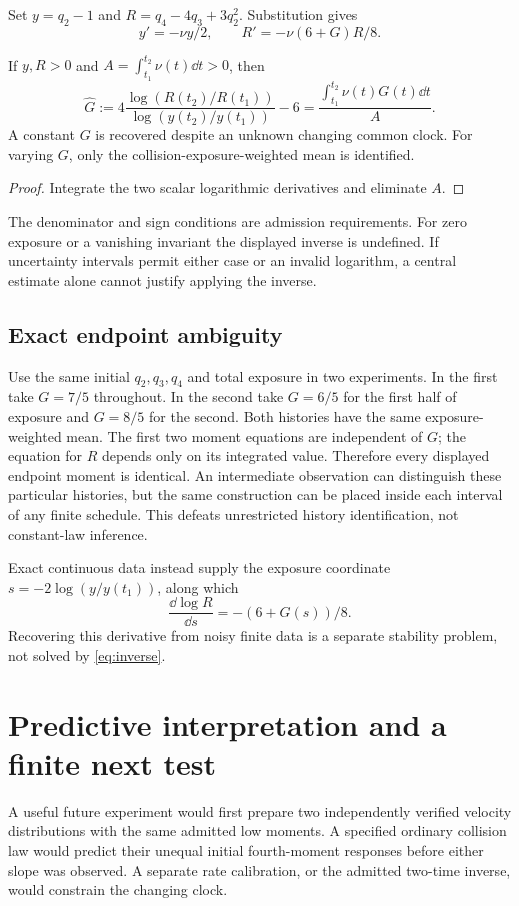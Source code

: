 \documentclass[11pt]{article}
\begin{document}
Set $y=q_2-1$ and $R=q_4-4q_3+3q_2^2$.
Substitution gives
\[
 y'=-\nu y/2,\qquad R'=-\nu(6+G)R/8.
\]
\begin{theorem}\label{thm:clock}
If $y,R>0$ and $A=\int_{t_1}^{t_2}\nu(t)\dd t>0$, then
\begin{equation}\label{eq:inverse}
 \widehat G:=
 4\frac{\log(R(t_2)/R(t_1))}{\log(y(t_2)/y(t_1))}-6
 =\frac{\int_{t_1}^{t_2}\nu(t)G(t)\dd t}{A}.
\end{equation}
A constant $G$ is recovered despite an unknown changing common clock.
For varying $G$, only the collision-exposure-weighted mean is identified.
\end{theorem}
\begin{proof}
Integrate the two scalar logarithmic derivatives and eliminate $A$.
\end{proof}
The denominator and sign conditions are admission requirements.
For zero exposure or a vanishing invariant the displayed inverse is
undefined. If uncertainty intervals permit either case or an invalid
logarithm, a central estimate alone cannot justify applying the inverse.

\subsection{Exact endpoint ambiguity}
Use the same initial $q_2,q_3,q_4$ and total exposure in two experiments.
In the first take $G=7/5$ throughout. In the second take $G=6/5$ for the
first half of exposure and $G=8/5$ for the second.
Both histories have the same exposure-weighted mean. The first two moment
equations are independent of $G$; the equation for $R$ depends only on
its integrated value. Therefore every displayed endpoint moment is identical.
An intermediate observation can distinguish these particular histories,
but the same construction can be placed inside each interval of any
finite schedule. This defeats unrestricted history identification, not
constant-law inference.

Exact continuous data instead supply the exposure coordinate
$s=-2\log(y/y(t_1))$, along which
\[
 \frac{\dd\log R}{\dd s}=-(6+G(s))/8.
\]
Recovering this derivative from noisy finite data is a separate stability
problem, not solved by \eqref{eq:inverse}.

\section{Predictive interpretation and a finite next test}
A useful future experiment would first prepare two independently verified
velocity distributions with the same admitted low moments. A specified
ordinary collision law would predict their unequal initial fourth-moment
responses before either slope was observed. A separate rate calibration,
or the admitted two-time inverse, would constrain the changing clock.
\end{document}
